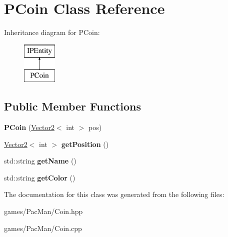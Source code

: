 \hypertarget{class_p_coin}{}\section{P\+Coin Class Reference}
\label{class_p_coin}
Inheritance diagram for P\+Coin\+:\begin{figure}[H]
\begin{center}
\leavevmode
\includegraphics[height=2.000000cm]{class_p_coin}
\end{center}
\end{figure}
\subsection*{Public Member Functions}
\begin{DoxyCompactItemize}
\item 
\mbox{\label{class_p_coin_ade72369af211c6301b9ce19d3949e3f7}} 
{\bfseries P\+Coin} (\hyperlink{struct_vector2}{Vector2}$<$ int $>$ pos)
\item 
\mbox{\label{class_p_coin_a929ca2a7bc64e2593ff48542e1a97737}} 
\hyperlink{struct_vector2}{Vector2}$<$ int $>$ {\bfseries get\+Position} ()
\item 
\mbox{\label{class_p_coin_a1fcb17fdcc1579c4a377afeab7fc65ac}} 
std\+::string {\bfseries get\+Name} ()
\item 
\mbox{\label{class_p_coin_a5855ef970021bac99481b87a94304335}} 
std\+::string {\bfseries get\+Color} ()
\end{DoxyCompactItemize}


The documentation for this class was generated from the following files\+:\begin{DoxyCompactItemize}
\item 
games/\+Pac\+Man/Coin.\+hpp\item 
games/\+Pac\+Man/Coin.\+cpp\end{DoxyCompactItemize}
